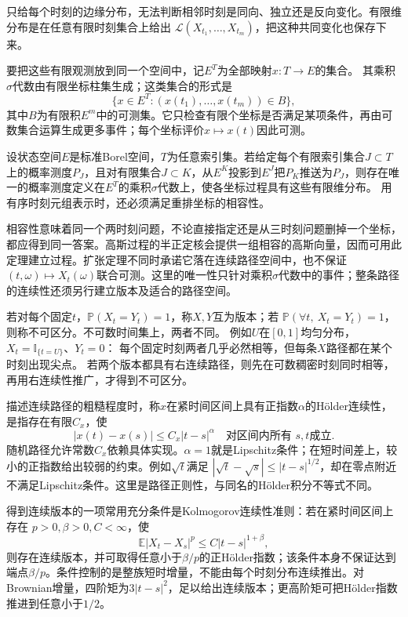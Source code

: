 只给每个时刻的边缘分布，无法判断相邻时刻是同向、独立还是反向变化。有限维分布是在任意有限时刻集合上给出
\(\mathcal L(X_{t_1},\ldots,X_{t_m})\)，把这种共同变化也保存下来。

要把这些有限观测放到同一个空间中，记\(E^T\)为全部映射\(x:T\to E\)的集合。
其乘积\(\sigma\)代数由有限坐标柱集生成；这类集合的形式是
\[
 \{x\in E^T:(x(t_1),\ldots,x(t_m))\in B\},
\]
其中\(B\)为有限积\(E^m\)中的可测集。它只检查有限个坐标是否满足某项条件，再由可数集合运算生成更多事件；每个坐标评价\(x\mapsto x(t)\)因此可测。

\begin{theorem}[Kolmogorov扩张的标准Borel版本]
\label{thm:rv-kolmogorov-extension}
设状态空间\(E\)是标准Borel空间，\(T\)为任意索引集。若给定每个有限索引集合\(J\subset T\)上的概率测度\(P_J\)，且对有限集合\(J\subset K\)，从\(E^K\)投影到\(E^J\)把\(P_K\)推送为\(P_J\)，则存在唯一的概率测度定义在\(E^T\)的乘积\(\sigma\)代数上，使各坐标过程具有这些有限维分布。
用有序时刻元组表示时，还必须满足重排坐标的相容性。
\end{theorem}
相容性意味着同一个两时刻问题，不论直接指定还是从三时刻问题删掉一个坐标，都应得到同一答案。高斯过程的半正定核会提供一组相容的高斯向量，因而可用此定理建立过程。扩张定理不同时承诺它落在连续路径空间中，也不保证
\((t,\omega)\mapsto X_t(\omega)\)联合可测。这里的唯一性只针对乘积\(\sigma\)代数中的事件；整条路径的连续性还须另行建立版本及适合的路径空间。

若对每个固定\(t\)，\(\mathbb P(X_t=Y_t)=1\)，称\(X,Y\)互为版本；若
\(\mathbb P(\forall t,\ X_t=Y_t)=1\)，则称不可区分。不可数时间集上，两者不同。
例如\(U\)在\([0,1]\)均匀分布，\(X_t=\mathbb I_{\{t=U\}}\)、\(Y_t=0\)：
每个固定时刻两者几乎必然相等，但每条\(X\)路径都在某个时刻出现尖点。
若两个版本都具有右连续路径，则先在可数稠密时刻同时相等，再用右连续性推广，才得到不可区分。

描述连续路径的粗糙程度时，称\(x\)在紧时间区间上具有正指数\(\alpha\)的Hölder连续性，是指存在有限\(C_x\)，使
\[
 |x(t)-x(s)|\leq C_x|t-s|^\alpha
 \quad\text{对区间内所有 }s,t\text{成立}.
\]
随机路径允许常数\(C_x\)依赖具体实现。\(\alpha=1\)就是Lipschitz条件；在短时间差上，较小的正指数给出较弱的约束。例如\(\sqrt t\)满足
\(|\sqrt t-\sqrt s|\leq|t-s|^{1/2}\)，却在零点附近不满足Lipschitz条件。这里是路径正则性，与同名的Hölder积分不等式不同。

得到连续版本的一项常用充分条件是Kolmogorov连续性准则：若在紧时间区间上存在
\(p>0,\beta>0,C<\infty\)，使
\[
\mathbb E|X_t-X_s|^p\leq C|t-s|^{1+\beta},
\]
则存在连续版本，并可取得任意小于\(\beta/p\)的正Hölder指数；该条件本身不保证达到端点\(\beta/p\)。条件控制的是整族短时增量，不能由每个时刻分布连续推出。对Brownian增量，四阶矩为\(3|t-s|^2\)，足以给出连续版本；更高阶矩可把Hölder指数推进到任意小于\(1/2\)。

